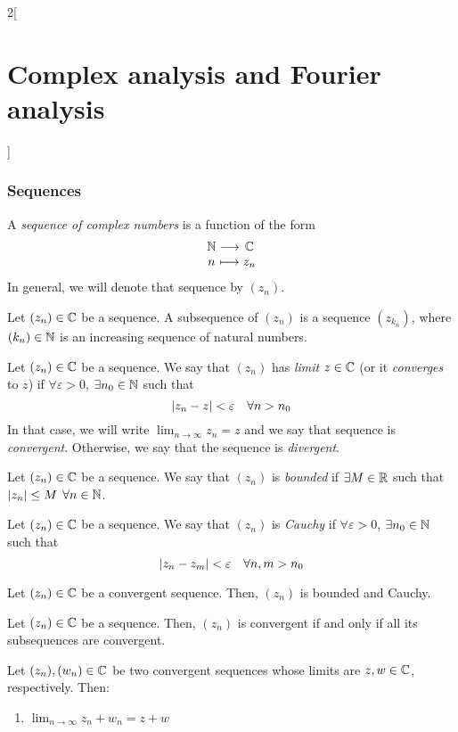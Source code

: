 \documentclass[../../../main.tex]{subfiles}
\begin{document}
\begin{multicols}{2}[\section{Complex analysis and Fourier analysis}]
  \subsubsection{Sequences}
  \begin{definition}
    A \textit{sequence of complex numbers} is a function of the form $$\function{}{\NN}{\CC}{n}{z_n}$$ In general, we will denote that sequence by $(z_n)$.
  \end{definition}
  \begin{definition}
    Let $(z_n)\in\mathbb{C}$ be a sequence. A subsequence of $(z_n)$ is a sequence $(z_{k_n})$, where $(k_n)\in\mathbb{N}$ is an increasing sequence of natural numbers.
  \end{definition}
  \begin{definition}
    Let $(z_n)\in\mathbb{C}$ be a sequence. We say that $(z_n)$ has \emph{limit} $z\in\mathbb{C}$ (or it \textit{converges} to $z$) if $\forall\varepsilon>0$, $\exists n_0\in\mathbb{N}$ such that $$\abs{z_n - z} < \varepsilon\quad \forall n > n_0$$ In that case, we will write $\displaystyle\lim_{n \to \infty} z_n = z$ and we say that sequence is \emph{convergent}. Otherwise, we say that the sequence is \emph{divergent}.
  \end{definition}
  \begin{definition}
    Let $(z_n)\in\mathbb{C}$ be a sequence. We say that $(z_n)$ is \emph{bounded} if $\exists M\in\mathbb{R}$ such that $\abs{z_n}\leq M$ $\forall n\in\mathbb{N}$.
  \end{definition}
  \begin{definition}
    Let $(z_n)\in\mathbb{C}$ be a sequence. We say that $(z_n)$ is \emph{Cauchy} if $\forall\varepsilon>0$, $\exists n_0\in\mathbb{N}$ such that $$\abs{z_n - z_m} < \varepsilon\quad \forall n,m > n_0$$
  \end{definition}
  \begin{proposition}
    Let $(z_n)\in\mathbb{C}$ be a convergent sequence. Then, $(z_n)$ is bounded and Cauchy.
  \end{proposition}
  \begin{proposition}
    Let $(z_n)\in\mathbb{C}$ be a sequence. Then, $(z_n)$ is convergent if and only if all its subsequences are convergent.
  \end{proposition}
  \begin{proposition}
    Let $(z_n),(w_n)\in\mathbb{C}$ be two convergent sequences whose limits are $z,w\in \mathbb{C}$, respectively. Then:
    \begin{enumerate}
      \item $\displaystyle\lim_{n\to\infty}z_n+w_n=z+w$

\end{enumerate}
\end{proposition}
\end{multicols}
\end{document}
